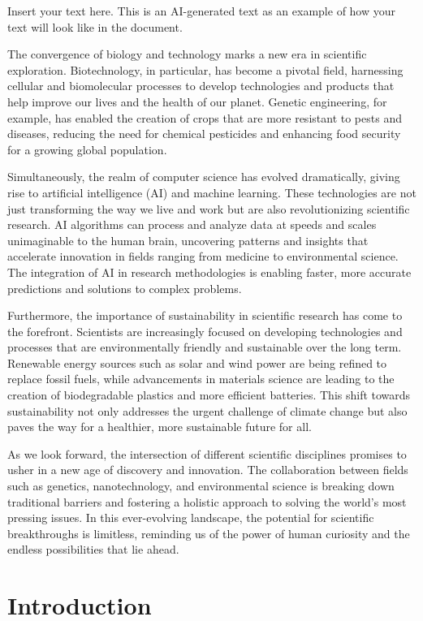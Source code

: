 Insert your text here. This is an AI-generated text as an example of how your text will look like in the document.

The convergence of biology and technology marks a new era in scientific exploration. Biotechnology, in particular, has become a pivotal field, harnessing cellular and biomolecular processes to develop technologies and products that help improve our lives and the health of our planet. Genetic engineering, for example, has enabled the creation of crops that are more resistant to pests and diseases, reducing the need for chemical pesticides and enhancing food security for a growing global population.

Simultaneously, the realm of computer science has evolved dramatically, giving rise to artificial intelligence (AI) and machine learning. These technologies are not just transforming the way we live and work but are also revolutionizing scientific research. AI algorithms can process and analyze data at speeds and scales unimaginable to the human brain, uncovering patterns and insights that accelerate innovation in fields ranging from medicine to environmental science. The integration of AI in research methodologies is enabling faster, more accurate predictions and solutions to complex problems.

Furthermore, the importance of sustainability in scientific research has come to the forefront. Scientists are increasingly focused on developing technologies and processes that are environmentally friendly and sustainable over the long term. Renewable energy sources such as solar and wind power are being refined to replace fossil fuels, while advancements in materials science are leading to the creation of biodegradable plastics and more efficient batteries. This shift towards sustainability not only addresses the urgent challenge of climate change but also paves the way for a healthier, more sustainable future for all.

As we look forward, the intersection of different scientific disciplines promises to usher in a new age of discovery and innovation. The collaboration between fields such as genetics, nanotechnology, and environmental science is breaking down traditional barriers and fostering a holistic approach to solving the world's most pressing issues. In this ever-evolving landscape, the potential for scientific breakthroughs is limitless, reminding us of the power of human curiosity and the endless possibilities that lie ahead.

\section{Introduction}
